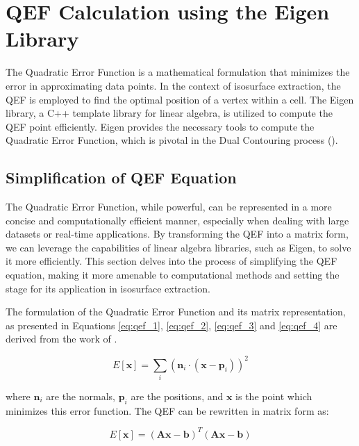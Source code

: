 \chapter{QEF Calculation using the Eigen Library} \label{Chapter5}

The Quadratic Error Function is a mathematical formulation that minimizes the error in approximating data points. In the context of isosurface extraction, the QEF is employed to find the optimal position of a vertex within a cell. The Eigen library, a C++ template library for linear algebra, is utilized to compute the QEF point efficiently. Eigen provides the necessary tools to compute the Quadratic Error Function, which is pivotal in the Dual Contouring process (\cite{Eigen_2013}).

\section{Simplification of QEF Equation}

The Quadratic Error Function, while powerful, can be represented in a more concise and computationally efficient manner, especially when dealing with large datasets or real-time applications. By transforming the QEF into a matrix form, we can leverage the capabilities of linear algebra libraries, such as Eigen, to solve it more efficiently. This section delves into the process of simplifying the QEF equation, making it more amenable to computational methods and setting the stage for its application in isosurface extraction.

The formulation of the Quadratic Error Function and its matrix representation, as presented in Equations \ref{eq:qef_1}, \ref{eq:qef_2}, \ref{eq:qef_3} and \ref{eq:qef_4} are derived from the work of \cite{Ju_2002}. 

\begin{equation}
E[\mathbf{x}] = \sum_{i} \left( \mathbf{n}_i \cdot (\mathbf{x} - \mathbf{p}_i) \right)^2
\label{eq:qef_1}
\end{equation}

\noindent where \( \mathbf{n}_i \) are the normals, \( \mathbf{p}_i \) are the positions, and \( \mathbf{x} \) is the point which minimizes this error function. The QEF can be rewritten in matrix form as:

\begin{equation}
E[\mathbf{x}] = (\mathbf{Ax} - \mathbf{b})^T (\mathbf{Ax} - \mathbf{b})
\label{eq:qef_2}
\end{equation}

